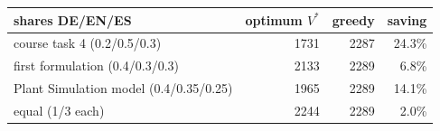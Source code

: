 \begin{tabular}{lrrr}
\toprule
shares DE/EN/ES & optimum $V^*$ & greedy & saving \\
\midrule
course task 4 (0.2/0.5/0.3) & 1731 & 2287 & 24.3\% \\
first formulation (0.4/0.3/0.3) & 2133 & 2289 & 6.8\% \\
Plant Simulation model (0.4/0.35/0.25) & 1965 & 2289 & 14.1\% \\
equal (1/3 each) & 2244 & 2289 & 2.0\% \\
\bottomrule
\end{tabular}
